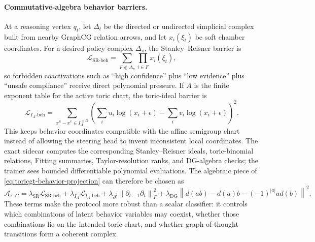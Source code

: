 \documentclass[11pt]{article}
\theoremstyle{definition}
\theoremstyle{plain}
\theoremstyle{remark}
\numberwithin{equation}{section}
\newcommand{\norm}[1]{\left\lVert #1\right\rVert}
\begin{document}
\paragraph{Commutative-algebra behavior barriers.}
At a reasoning vertex $q_t$, let $\Delta_t$ be the directed or undirected simplicial complex built from nearby GraphCG relation arrows, and let $x_i(\xi_t)$ be soft chamber coordinates.  For a desired policy complex $\Delta_\pi$, the Stanley--Reisner barrier is
\begin{equation}
  \mathcal L_{\mathrm{SR\text{-}beh}}
  =
  \sum_{F\notin\Delta_\pi}\prod_{i\in F}x_i(\xi_t),
\end{equation}
so forbidden coactivations such as ``high confidence'' plus ``low evidence'' plus ``unsafe compliance'' receive direct polynomial pressure.  If $A$ is the finite exponent table for the active toric chart, the toric-ideal barrier is
\begin{equation}
  \mathcal L_{I_A\text{-}\mathrm{beh}}
  =
  \sum_{x^u-x^v\in I_A^{\le D}}
  \left(\sum_i u_i \log(x_i+\epsilon)-\sum_i v_i \log(x_i+\epsilon)\right)^2 .
\end{equation}
This keeps behavior coordinates compatible with the affine semigroup chart instead of allowing the steering head to invent inconsistent local coordinates.  The exact sidecar computes the corresponding Stanley--Reisner ideals, toric-binomial relations, Fitting summaries, Taylor-resolution ranks, and DG-algebra checks; the trainer sees bounded differentiable polynomial evaluations.  The algebraic piece of \eqref{eq:toricgt-behavior-projection} can therefore be chosen as
\begin{equation}
  \mathcal A_{\pi,C}
  =
  \lambda_{\mathrm{SR}}\mathcal L_{\mathrm{SR\text{-}beh}}
  +\lambda_{I_A}\mathcal L_{I_A\text{-}\mathrm{beh}}
  +\lambda_{\partial^2}\norm{\partial_{t-1}\partial_t}_F^2
  +\lambda_{\mathrm{DG}}\norm{d(ab)-d(a)b-(-1)^{|a|}ad(b)}^2 .
\end{equation}
These terms make the protocol more robust than a scalar classifier: it controls which combinations of latent behavior variables may coexist, whether those combinations lie on the intended toric chart, and whether graph-of-thought transitions form a coherent complex.
\end{document}
